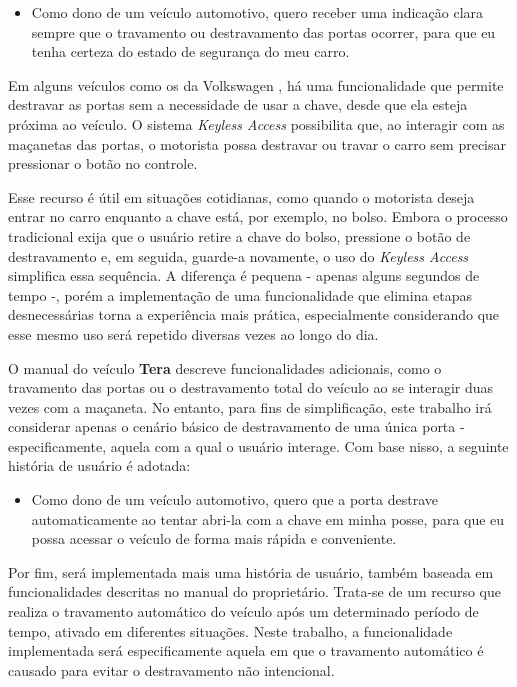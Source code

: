 \begin{itemize}
    \item Como dono de um veículo automotivo, quero receber uma indicação clara sempre que o travamento ou destravamento das portas ocorrer, para que eu tenha certeza do estado de segurança do meu carro.
\end{itemize}

Em alguns veículos como os da Volkswagen \cite{vwLocking}, há uma funcionalidade que permite destravar as portas sem a necessidade de usar a chave, desde que ela 
esteja próxima ao veículo. O sistema \textit{Keyless Access} possibilita que, ao interagir com as maçanetas das portas, o motorista possa destravar ou travar o carro sem 
precisar pressionar o botão no controle.

Esse recurso é útil em situações cotidianas, como quando o motorista deseja entrar no carro enquanto a chave está, por exemplo, no bolso. Embora o processo 
tradicional exija que o usuário retire a chave do bolso, pressione o botão de destravamento e, em seguida, guarde-a novamente, o uso do \textit{Keyless Access} simplifica 
essa sequência. A diferença é pequena - apenas alguns segundos de tempo -, porém a implementação de uma funcionalidade que elimina etapas desnecessárias torna a 
experiência mais prática, especialmente considerando que esse mesmo uso será repetido diversas vezes ao longo do dia.

O manual do veículo \textbf{Tera} descreve funcionalidades adicionais, como o travamento das portas ou o destravamento total do veículo ao se interagir duas vezes com a maçaneta. 
No entanto, para fins de simplificação, este trabalho irá considerar apenas o cenário básico de destravamento de uma única porta - especificamente, aquela com a 
qual o usuário interage. Com base nisso, a seguinte história de usuário é adotada:

\begin{itemize}
    \item Como dono de um veículo automotivo, quero que a porta destrave automaticamente ao tentar abri-la com a chave em minha posse, para que eu possa acessar o veículo de forma mais rápida e conveniente.
\end{itemize}

Por fim, será implementada mais uma história de usuário, também baseada em funcionalidades descritas no manual do proprietário. Trata-se de um recurso que realiza o 
travamento automático do veículo após um determinado período de tempo, ativado em diferentes situações. Neste trabalho, a funcionalidade implementada será especificamente 
aquela em que o travamento automático é causado para evitar o destravamento não intencional.

